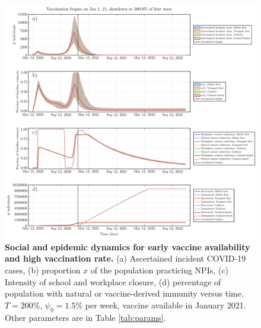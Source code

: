     \begin{figure}[H]
    \centering
    \includegraphics[width = 16 cm]{appendices/FigureS7.pdf}
    \caption{\textbf{Social and epidemic dynamics for early vaccine availability and high vaccination rate.} (a) Ascertained incident COVID-19 cases, (b) proportion $x$ of the population practicing NPIs, (c) Intensity of school and workplace closure, (d) percentage of population with natural or vaccine-derived immunity versus time. $T=200 \%$, $\psi_0=1.5 \%$ per week, vaccine available in January 2021.   Other parameters are in Table \ref{tab:params}.}
    \label{plot_model}
    \end{figure}
    
    \clearpage 
    
